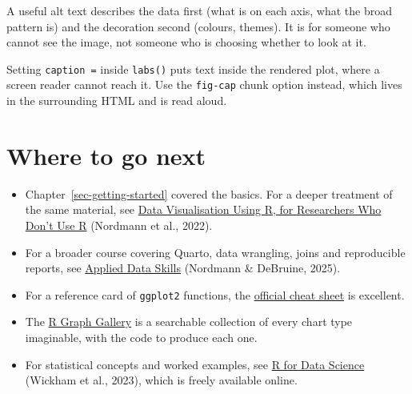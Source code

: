 \documentclass[
  english,
  letterpaper,
]{book}
\providecommand{\tightlist}{%
  \setlength{\itemsep}{0pt}\setlength{\parskip}{0pt}}
\begin{document}
A useful alt text describes the data first (what is on each axis, what
the broad pattern is) and the decoration second (colours, themes). It is
for someone who cannot see the image, not someone who is choosing
whether to look at it.

\begin{tcolorbox}[enhanced jigsaw, colframe=quarto-callout-warning-color-frame, breakable, left=2mm, leftrule=.75mm, toptitle=1mm, rightrule=.15mm, opacitybacktitle=0.6, arc=.35mm, colback=white, title=\textcolor{quarto-callout-warning-color}{\faExclamationTriangle}\hspace{0.5em}{Warning}, coltitle=black, colbacktitle=quarto-callout-warning-color!10!white, toprule=.15mm, bottomtitle=1mm, opacityback=0, titlerule=0mm, bottomrule=.15mm]

Setting \texttt{caption\ =} inside \texttt{labs()} puts text inside the
rendered plot, where a screen reader cannot reach it. Use the
\texttt{fig-cap} chunk option instead, which lives in the surrounding
HTML and is read aloud.

\end{tcolorbox}

\section{Where to go next}\label{where-to-go-next}

\begin{itemize}
\tightlist
\item
  Chapter~\ref{sec-getting-started} covered the basics. For a deeper
  treatment of the same material, see
  \href{https://psyteachr.github.io/introdataviz/}{Data Visualisation
  Using R, for Researchers Who Don't Use R} (Nordmann et al., 2022).
\item
  For a broader course covering Quarto, data wrangling, joins and
  reproducible reports, see
  \href{https://psyteachr.github.io/ads-v3/}{Applied Data Skills}
  (Nordmann \& DeBruine, 2025).
\item
  For a reference card of \texttt{ggplot2} functions, the
  \href{https://rstudio.github.io/cheatsheets/html/data-visualization.html}{official
  cheat sheet} is excellent.
\item
  The \href{https://r-graph-gallery.com/}{R Graph Gallery} is a
  searchable collection of every chart type imaginable, with the code to
  produce each one.
\item
  For statistical concepts and worked examples, see
  \href{https://r4ds.hadley.nz/}{R for Data Science} (Wickham et al.,
  2023), which is freely available online.
\end{itemize}
\end{document}
